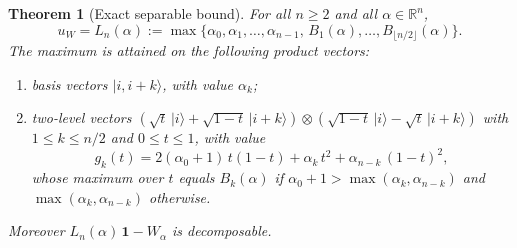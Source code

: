 \documentclass[11pt,a4paper]{article}
\newtheorem{theorem}{Theorem}
\theoremstyle{remark}
\newcommand{\ket}[1]{\lvert #1\rangle}
\newcommand{\id}{\mathbf{1}}
\newcommand{\uW}{u_W}
\begin{document}
\begin{theorem}[Exact separable bound]\label{thm:exact}
For all $n\ge2$ and all $\alpha\in\mathbb{R}^n$,
\begin{equation}\label{eq:L}
\uW=L_n(\alpha):=\max\bigl\{\alpha_0,\alpha_1,\dots,\alpha_{n-1},\,
B_1(\alpha),\dots,B_{\lfloor n/2\rfloor}(\alpha)\bigr\}.
\end{equation}
The maximum is attained on the following product vectors:
\begin{enumerate}
\item[(i)] basis vectors $\ket{i,i+k}$, with value $\alpha_k$;
\item[(ii)] two-level vectors
$(\sqrt t\,\ket i+\sqrt{1-t}\,\ket{i+k})\otimes(\sqrt{1-t}\,\ket i-\sqrt t\,\ket{i+k})$
with $1\le k\le n/2$ and $0\le t\le1$, with value
\begin{equation}\label{eq:gk}
g_k(t)=2(\alpha_0+1)\,t(1-t)+\alpha_k\,t^{2}+\alpha_{n-k}\,(1-t)^{2},
\end{equation}
whose maximum over $t$ equals $B_k(\alpha)$ if $\alpha_0+1>\max(\alpha_k,\alpha_{n-k})$
and $\max(\alpha_k,\alpha_{n-k})$ otherwise.
\end{enumerate}
Moreover $L_n(\alpha)\,\id-W_\alpha$ is decomposable.
\end{theorem}
\end{document}
